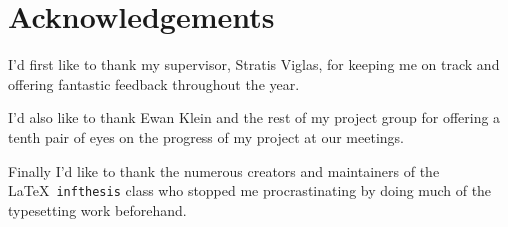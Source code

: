 \section*{Acknowledgements}

	I'd first like to thank my supervisor, Stratis Viglas, for keeping me on
	track and offering fantastic feedback throughout the year.

	I'd also like to thank Ewan Klein and the rest of my project group for
	offering a tenth pair of eyes on the progress of my project at our
	meetings.

	Finally I'd like to thank the numerous creators and maintainers of the
	\LaTeX\ \texttt{infthesis} class who stopped me procrastinating by doing
	much of the typesetting work beforehand.

